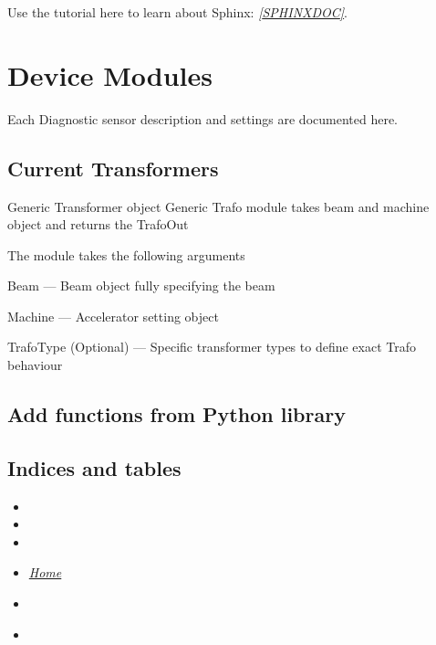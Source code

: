 \documentclass[letterpaper,10pt,english]{sphinxmanual}
\begin{document}
Use the tutorial here to learn about Sphinx: \label{machine:id1}{\hyperref[machine:sphinxdoc]{\emph{{[}SPHINXDOC{]}}}}.


\section{Device Modules}
\label{device_modules:device-modules}\label{device_modules::doc}
Each Diagnostic sensor description and settings are documented here.


\subsection{Current Transformers}
\label{device_modules:current-transformers}
Generic Transformer object
\label{device_modules:module-TrafoModule}
Generic Trafo module takes beam and machine object and returns the TrafoOut

The module takes the following arguments

Beam --- Beam object fully specifying the beam

Machine --- Accelerator setting object

TrafoType (Optional) --- Specific transformer types to define exact Trafo behaviour


\subsection{Add functions from Python library}
\label{device_modules:add-functions-from-python-library}
\href{https://docs.python.org/library/io.html\#io.open}{}


\subsection{Indices and tables}
\label{device_modules:indices-and-tables}\begin{itemize}
\item {} 

\item {} 

\item {} 

\item {} 
{\hyperref[index::doc]{\emph{\emph{Home}}}}

\item {} 
{\hyperref[index:index-label]{\emph{}}}

\item {} 
{\hyperref[beam:beam-label]{\emph{}}}

\end{itemize}
\end{document}
